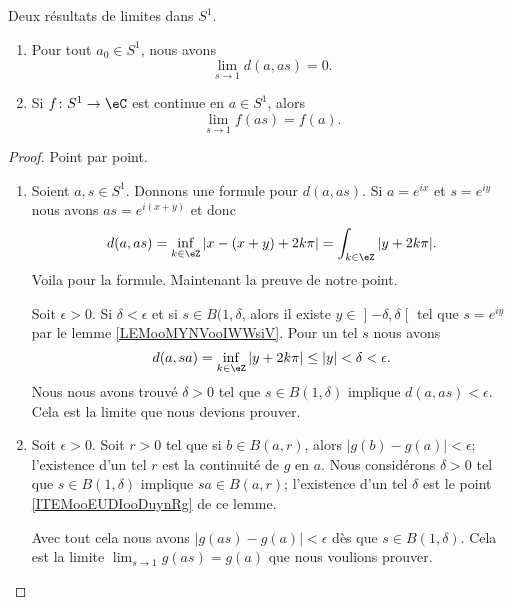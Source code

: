 \begin{lemma}        \label{LEMooTKFHooJaeMyc}
    Deux résultats de limites dans \( S^1\).
    \begin{enumerate}
        \item       \label{ITEMooEUDIooDuynRg}
            Pour tout \( a_0\in S^1\), nous avons
            \begin{equation}
                \lim_{s\to 1} d(a,as)=0.
            \end{equation}
        \item       \label{ITEMooXCBUooUxQldB}
            Si \( f\colon S^1\to \eC\) est continue en \( a\in S^1\), alors 
            \begin{equation}
                \lim_{s\to 1} f(as)=f(a).
            \end{equation}
    \end{enumerate}
\end{lemma}

\begin{proof}
    Point par point.
    \begin{enumerate}
        \item
            Soient \( a,s\in S^1\). Donnons une formule pour \( d(a,as)\). Si \( a= e^{ix}\) et \( s= e^{iy}\) nous avons \( as= e^{i(x+y)}\) et donc
            \begin{equation}
                d(a,as)=\inf_{k\in \eZ}| x-(x+y)+2k\pi |=\int_{k\in \eZ}| y+2k\pi |.
            \end{equation}
            Voila pour la formule. Maintenant la preuve de notre point.

            Soit \( \epsilon>0\). Si \( \delta<\epsilon\) et si \( s\in B(1,\delta\), alors il existe \( y\in \mathopen] -\delta , \delta \mathclose[\) tel que \( s= e^{iy}\) par le lemme \ref{LEMooMYNVooIWWsiV}. Pour un tel \( s\) nous avons
                \begin{equation}
                    d(a,sa)=\inf_{k\in \eZ}| y+2k\pi |\leq | y |<\delta<\epsilon.
                \end{equation}
                Nous nous avons trouvé \( \delta>0\) tel que \( s\in B(1,\delta)\) implique \( d(a,as)<\epsilon\). Cela est la limite que nous devions prouver.
            \item
                Soit \( \epsilon>0\). Soit \( r>0\) tel que si \( b\in B(a,r)\), alors \( | g(b)-g(a) |<\epsilon\); l'existence d'un tel \( r\) est la continuité de \( g\) en \( a\). Nous considérons \( \delta>0\) tel que \( s\in B(1,\delta)\) implique \( sa\in B(a,r)\); l'existence d'un tel \( \delta\) est le point \ref{ITEMooEUDIooDuynRg} de ce lemme.

                Avec tout cela nous avons \( | g(as)-g(a) |<\epsilon\) dès que \( s\in B(1,\delta)\). Cela est la limite \( \lim_{s\to 1} g(as)=g(a)\) que nous voulions prouver.
    \end{enumerate}
\end{proof}

